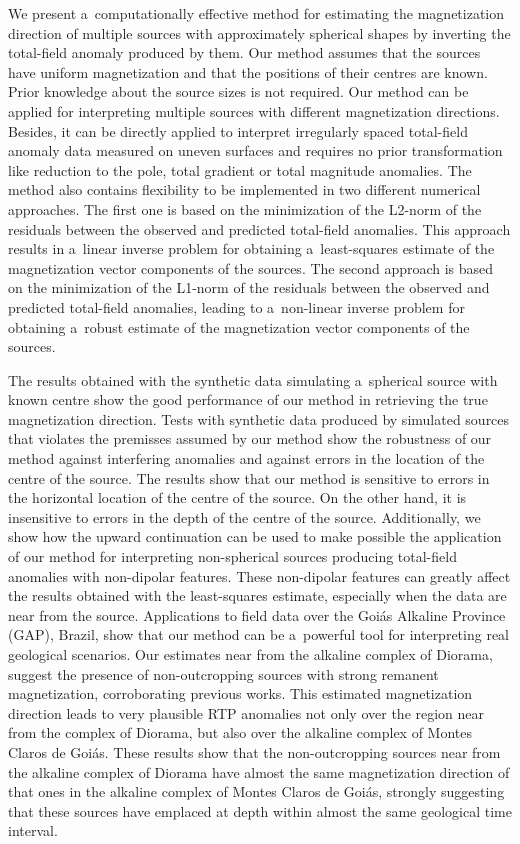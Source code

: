 \documentclass[journal abbreviation, npg]{copernicus}
\begin{document}
\conclusions We present a~computationally effective method for estimating the
magnetization direction of multiple sources with approximately spherical
shapes by inverting the total-field anomaly produced by them. Our method
assumes that the sources have uniform magnetization and that the positions of
their centres are known. Prior knowledge about the source sizes is not
required. Our method can be applied for interpreting multiple sources with
different magnetization directions. Besides, it can be directly applied to
interpret irregularly spaced total-field anomaly data measured on uneven
surfaces and requires no prior transformation like reduction to the pole,
total gradient or total magnitude anomalies. The method also contains
flexibility to be implemented in two different numerical approaches. The
first one is based on the minimization of the L2-norm of the residuals
between the observed and predicted total-field anomalies. This approach
results in a~linear inverse problem for obtaining a~least-squares estimate of
the magnetization vector components of the sources. The second approach is
based on the minimization of the L1-norm of the residuals between the
observed and predicted total-field anomalies, leading to a~non-linear inverse
problem for obtaining a~robust estimate of the magnetization vector
components of the sources.

The results obtained with the synthetic data simulating a~spherical source
with known centre show the good performance of our method in retrieving the
true magnetization direction. Tests with synthetic data produced by simulated
sources that violates the premisses assumed by our method show the robustness
of our method against interfering anomalies and against errors in the
location of the centre of the source. The results show that our method is
sensitive to errors in the horizontal location of the centre of the source.
On the other hand, it is insensitive to errors in the depth of the centre of
the source. Additionally, we show how the upward continuation can be used to
make possible the application of our method for interpreting non-spherical
sources producing total-field anomalies with non-dipolar features. These
non-dipolar features can greatly affect the results obtained with the
least-squares estimate, especially when the data are near from the source.
Applications to field data over the Goi\'{a}s Alkaline Province (GAP),
Brazil, show that our method can be a~powerful tool for interpreting real
geological scenarios. Our estimates near from the alkaline complex of
Diorama, suggest the presence of non-outcropping sources with strong remanent
magnetization, corroborating previous works. This estimated magnetization
direction leads to very plausible RTP anomalies not only over the region near
from the complex of Diorama, but also over the alkaline complex of Montes
Claros de Goi\'{a}s. These results show that the non-outcropping sources near
from the alkaline complex of Diorama have almost the same magnetization
direction of that ones in the alkaline complex of Montes Claros de Goi\'{a}s,
strongly suggesting that these sources have emplaced at depth within almost
the same geological time interval.
\end{document}
